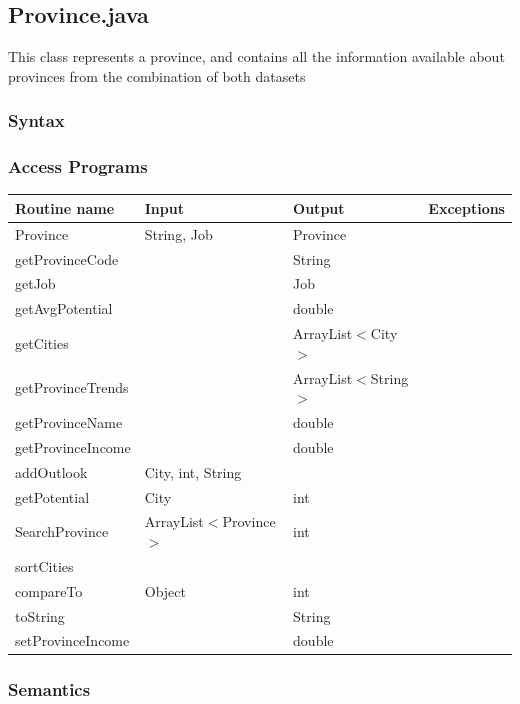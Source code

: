 \documentclass[12pt,fleqn]{article}
\begin{document}

\subsection*{Province.java}\label{prov}
This class represents a province, and contains all the information available about provinces from the combination of both datasets
\subsubsection* {Syntax}

\subsubsection* {Access Programs}
\begin{tabular}{| l | l | l | l |}
\hline
\textbf{Routine name} & \textbf{Input} & \textbf{Output} & \textbf{Exceptions}\\
\hline
Province & String, Job & Province & ~\\
\hline
 getProvinceCode& ~ & String & ~\\
\hline
getJob & ~ & Job & ~\\
\hline
getAvgPotential & ~ & double & ~\\
\hline
getCities & ~ & ArrayList$<$City$>$ & ~\\
\hline
getProvinceTrends & ~ &  ArrayList$<$String$>$ & ~\\
\hline
getProvinceName & ~ & double & ~\\
\hline
getProvinceIncome & ~ & double & ~\\
\hline
addOutlook & City, int, String & ~ & ~\\
\hline
getPotential & City & int & ~\\
\hline
SearchProvince & ArrayList$<$Province$>$ & int & ~\\
\hline
sortCities & ~ & ~ & ~\\
\hline
compareTo & Object & int & ~\\
\hline
toString & ~ & String & ~\\
\hline
setProvinceIncome & ~ & double & ~\\
\hline
\end{tabular}

\subsubsection*{Semantics}
\end{document}
